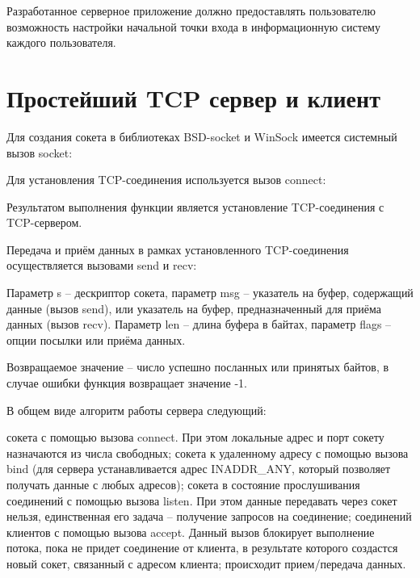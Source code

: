 Разработанное серверное приложение должно предоставлять пользователю возможность настройки начальной точки входа в информационную систему каждого пользователя.

\section{Простейший TCP сервер и клиент}

Для создания сокета в библиотеках BSD-socket и WinSock имеется системный вызов socket:

\vspace{5mm}


\parindent=1cm

\vspace{5mm}

Для установления TCP-соединения используется вызов connect:


\parindent=1cm

Результатом выполнения функции является установление TCP-соединения с TCP-сервером.

\vspace{5mm}

Передача и приём данных в рамках установленного TCP-соединения осуществляется вызовами send и recv:


\parindent=1cm

Параметр s – дескриптор сокета, параметр msg – указатель на буфер, содержащий данные (вызов send), или указатель на буфер, предназначенный для приёма данных (вызов recv). Параметр len – длина буфера в байтах, параметр flags – опции посылки или приёма данных.

Возвращаемое значение – число успешно посланных или принятых байтов, в случае ошибки функция возвращает значение -1.

\vspace{5mm}

В общем виде алгоритм работы сервера следующий: 
\vspace{5mm}

\begin{enumerate}
 сокета с помощью вызова connect. При этом локальные адрес и порт сокету назначаются из числа свободных;  
 сокета к удаленному адресу с помощью вызова bind (для сервера устанавливается адрес INADDR\_ANY, который позволяет получать данные с любых адресов); 
 сокета в состояние прослушивания соединений с помощью вызова listen. При этом данные передавать через сокет нельзя, единственная его задача – получение запросов на соединение; 
 соединений клиентов с помощью вызова accept. Данный вызов блокирует выполнение потока, пока не придет соединение от клиента, в результате которого создастся новый сокет, связанный с адресом клиента; 
 происходит прием/передача данных. 
\end{enumerate}

